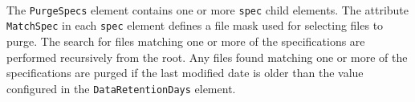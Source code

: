 \noindent\\The \texttt{PurgeSpecs} element contains one or more \texttt{spec} child elements.  The attribute \texttt{MatchSpec} in each \texttt{spec} element
defines a file mask used for selecting files to purge.  The search for files matching one or more of the specifications are performed recursively
from the root.  Any files found matching one or more of the specifications are purged if the last modified date is older than the value configured
in the \texttt{DataRetentionDays} element.
